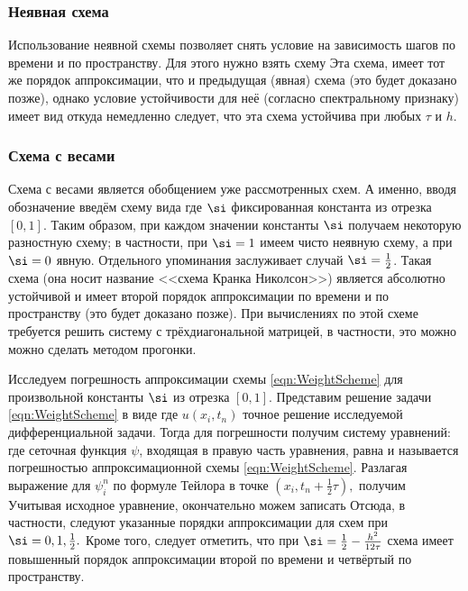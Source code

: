 \documentclass[a4paper]{article}
\begin{document}
\subsubsection{Неявная схема}
Использование неявной схемы позволяет снять условие на зависимость
шагов по времени и по пространству.  Для этого нужно взять схему
Эта схема, имеет тот же порядок аппроксимации, что и предыдущая
(явная) схема (это будет доказано позже), однако условие устойчивости
для неё (согласно спектральному признаку) имеет вид
 откуда
немедленно следует, что эта схема устойчива при любых $\tau$ и $h$.

\subsubsection{Схема с весами}

Схема с весами является обобщением уже рассмотренных схем. А именно,
вводя обозначение  введём схему вида
 где $\si$ фиксированная константа из
отрезка $[0,1]$. Таким образом, при каждом значении константы $\si$
получаем некоторую разностную схему; в частности, при $\si=1$ имеем
чисто неявную схему, а при $\si=0$ явную. Отдельного упоминания
заслуживает случай $\si=\frac12$. Такая схема (она носит название
<<схема Кранка Николсон>>) является абсолютно устойчивой и имеет
второй порядок аппроксимации по времени и по пространству (это будет
доказано позже). При вычислениях по этой схеме требуется решить
систему с трёхдиагональной матрицей, в частности, это можно можно
сделать методом прогонки.

Исследуем погрешность аппроксимации схемы \eqref{eqn:WeightScheme} для
произвольной константы $\si$ из отрезка $[0,1]$.  Представим решение
задачи \eqref{eqn:WeightScheme} в виде 
где $u(x_i,t_n)$ точное решение исследуемой дифференциальной задачи.
Тогда для погрешности получим систему уравнений:
 где сеточная функция $\psi$, входящая в правую
часть уравнения, равна  и называется погрешностью
аппроксимационной схемы \eqref{eqn:WeightScheme}.  Разлагая выражение
для $\psi_i^n$ по формуле Тейлора в точке $(x_i,t_n+\frac12\tau),$
получим   Учитывая исходное
уравнение, окончательно можем записать
Отсюда, в частности, следуют указанные порядки аппроксимации для схем
при $\si=0,1,\frac{1}{2}.$ Кроме того, следует отметить, что при
$\si=\frac12-\frac{h^2}{12\tau}$ схема имеет повышенный порядок
аппроксимации второй по времени и четвёртый по пространству.
\end{document}
